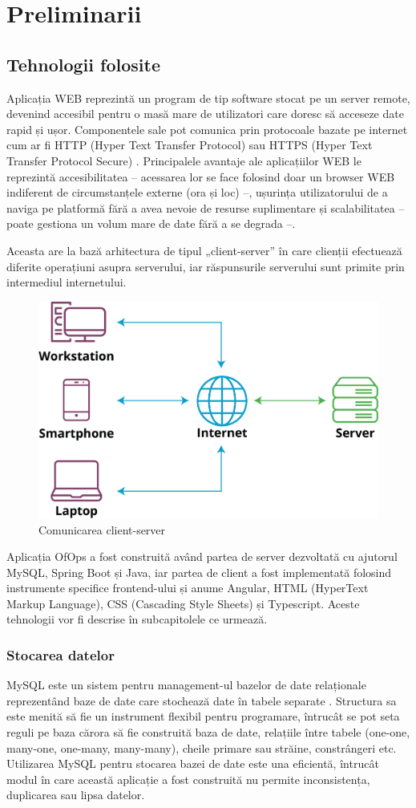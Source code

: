 \chapter{Preliminarii}

\section{Tehnologii folosite}
Aplicația WEB reprezintă un program de tip software stocat pe un server remote, devenind accesibil pentru o masă mare de utilizatori care doresc să acceseze date rapid și ușor. Componentele sale pot  comunica prin protocoale bazate pe internet cum ar fi HTTP (Hyper Text Transfer Protocol) sau HTTPS (Hyper Text Transfer Protocol Secure) \cite{citation1}.  Principalele avantaje ale aplicațiilor WEB le reprezintă accesibilitatea – acessarea lor se face folosind doar un browser WEB indiferent de circumstanțele externe (ora și loc) –, ușurința utilizatorului de a naviga pe platformă fără a avea nevoie de resurse suplimentare și scalabilitatea – poate gestiona un volum mare de date fără a se degrada –.

Aceasta are la bază arhitectura de tipul „client-server” în care clienții efectuează diferite operațiuni asupra serverului, iar răspunsurile serverului sunt primite prin intermediul internetului. 

\begin{figure}[!htb]
    \centering
    \includegraphics[width=0.45\linewidth]{images/client-server-network.png}
    \caption{Comunicarea client-server}
    \label{fig:client-server}
\end{figure}

\newpage
Aplicația OfOps a fost construită având partea de server dezvoltată cu ajutorul MySQL, Spring Boot și Java, iar partea de client a fost implementată folosind instrumente specifice frontend-ului și anume Angular, HTML (HyperText Markup Language), CSS (Cascading Style Sheets) și Typescript. Aceste tehnologii vor fi descrise în subcapitolele ce urmează. 

\subsection{Stocarea datelor}
MySQL este un sistem pentru management-ul bazelor de date relaționale reprezentând baze de date care stochează date în tabele separate \cite{citation2}. Structura sa este menită să fie un instrument flexibil pentru programare, întrucât se pot seta reguli pe baza cărora să fie construită baza de date, relațiile între tabele (one-one, many-one, one-many, many-many), cheile primare sau străine, constrângeri etc. Utilizarea MySQL pentru stocarea bazei de date este una eficientă, întrucât modul în care această aplicație a fost construită nu permite inconsistența, duplicarea sau lipsa datelor.

